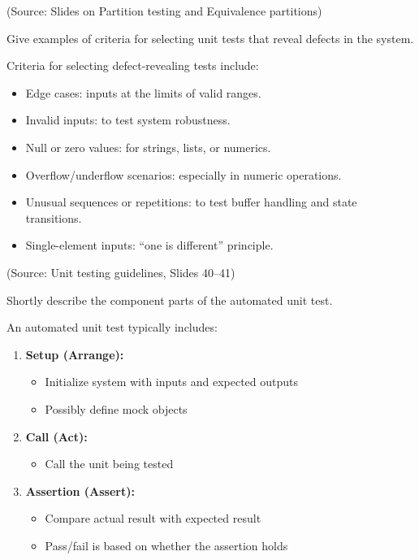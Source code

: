 \documentclass[12pt]{article}
\begin{document}
(Source: Slides on Partition testing and Equivalence partitions)

\begin{questionbox}
Give examples of criteria for selecting unit tests that reveal defects in the system.
\end{questionbox}

Criteria for selecting defect-revealing tests include:
\begin{itemize}
    \item Edge cases: inputs at the limits of valid ranges.
    \item Invalid inputs: to test system robustness.
    \item Null or zero values: for strings, lists, or numerics.
    \item Overflow/underflow scenarios: especially in numeric operations.
    \item Unusual sequences or repetitions: to test buffer handling and state transitions.
    \item Single-element inputs: ``one is different'' principle.
\end{itemize}

(Source: Unit testing guidelines, Slides 40--41)

\begin{questionbox}
Shortly describe the component parts of the automated unit test.
\end{questionbox}

An automated unit test typically includes:
\begin{enumerate}
    \item \textbf{Setup (Arrange):}
    \begin{itemize}
        \item Initialize system with inputs and expected outputs
        \item Possibly define mock objects
    \end{itemize}
    
    \item \textbf{Call (Act):}
    \begin{itemize}
        \item Call the unit being tested
    \end{itemize}
    
    \item \textbf{Assertion (Assert):}
    \begin{itemize}
        \item Compare actual result with expected result
        \item Pass/fail is based on whether the assertion holds
    \end{itemize}
\end{enumerate}
\end{document}

